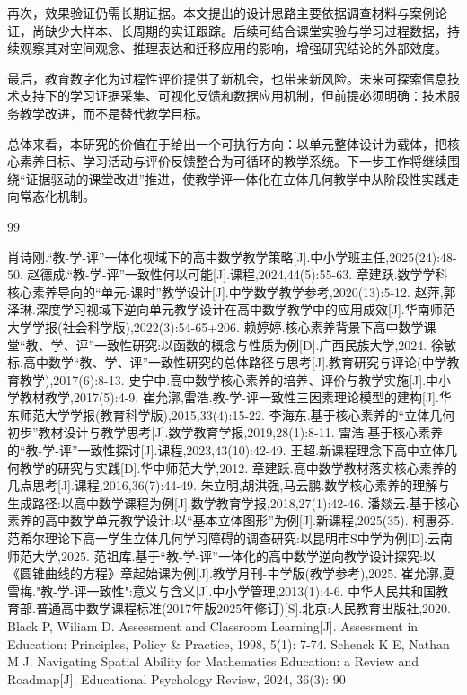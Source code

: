 \documentclass[UTF8,a4paper,12pt,twoside]{ctexart}
\begin{document}
再次，效果验证仍需长期证据。本文提出的设计思路主要依据调查材料与案例论证，尚缺少大样本、长周期的实证跟踪。后续可结合课堂实验与学习过程数据，持续观察其对空间观念、推理表达和迁移应用的影响，增强研究结论的外部效度。

最后，教育数字化为过程性评价提供了新机会，也带来新风险。未来可探索信息技术支持下的学习证据采集、可视化反馈和数据应用机制，但前提必须明确：技术服务教学改进，而不是替代教学目标。

总体来看，本研究的价值在于给出一个可执行方向：以单元整体设计为载体，把核心素养目标、学习活动与评价反馈整合为可循环的教学系统。下一步工作将继续围绕“证据驱动的课堂改进”推进，使教学评一体化在立体几何教学中从阶段性实践走向常态化机制。

\newpage

\begin{thebibliography}{99}
\setlength{\itemsep}{-0.75ex}
肖诗刚.``教-学-评''一体化视域下的高中数学教学策略[J].中小学班主任,2025(24):48-50.
赵德成.``教-学-评''一致性何以可能[J].课程,2024,44(5):55-63.
章建跃.数学学科核心素养导向的``单元-课时''教学设计[J].中学数学教学参考,2020(13):5-12.
赵萍,郭泽琳.深度学习视域下逆向单元教学设计在高中数学教学中的应用成效[J].华南师范大学学报(社会科学版),2022(3):54-65+206.
赖婷婷.核心素养背景下高中数学课堂``教、学、评''一致性研究:以函数的概念与性质为例[D].广西民族大学,2024.
徐敏标.高中数学``教、学、评''一致性研究的总体路径与思考[J].教育研究与评论(中学教育教学),2017(6):8-13.
史宁中.高中数学核心素养的培养、评价与教学实施[J].中小学教材教学,2017(5):4-9.
崔允漷,雷浩.教-学-评一致性三因素理论模型的建构[J].华东师范大学学报(教育科学版),2015,33(4):15-22.
李海东.基于核心素养的``立体几何初步''教材设计与教学思考[J].数学教育学报,2019,28(1):8-11.
雷浩.基于核心素养的``教-学-评''一致性探讨[J].课程,2023,43(10):42-49.
王超.新课程理念下高中立体几何教学的研究与实践[D].华中师范大学,2012.
章建跃.高中数学教材落实核心素养的几点思考[J].课程,2016,36(7):44-49.
朱立明,胡洪强,马云鹏.数学核心素养的理解与生成路径:以高中数学课程为例[J].数学教育学报,2018,27(1):42-46.
潘燚云.基于核心素养的高中数学单元教学设计:以``基本立体图形''为例[J].新课程,2025(35).
柯惠芬.范希尔理论下高一学生立体几何学习障碍的调查研究:以昆明市S中学为例[D].云南师范大学,2025.
范祖库.基于``教-学-评''一体化的高中数学逆向教学设计探究:以《圆锥曲线的方程》章起始课为例[J].教学月刊-中学版(教学参考),2025.
崔允漷,夏雪梅."教-学-评一致性":意义与含义[J].中小学管理,2013(1):4-6.
中华人民共和国教育部.普通高中数学课程标准(2017年版2025年修订)[S].北京:人民教育出版社,2020.
Black P, Wiliam D. Assessment and Classroom Learning[J]. Assessment in Education: Principles, Policy \& Practice, 1998, 5(1): 7-74.
Schenck K E, Nathan M J. Navigating Spatial Ability for Mathematics Education: a Review and Roadmap[J]. Educational Psychology Review, 2024, 36(3): 90
\end{thebibliography}
\newpage
\end{document}

